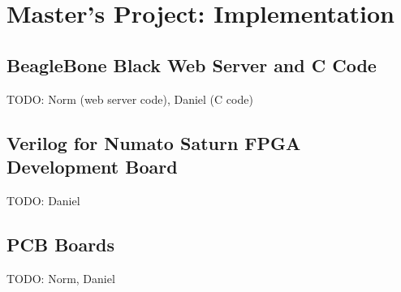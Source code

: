 \section{Master's Project: Implementation}

\subsection{BeagleBone Black Web Server and C Code}
TODO: Norm (web server code), Daniel (C code)
\subsection{Verilog for Numato Saturn FPGA Development Board}
TODO: Daniel
\subsection{PCB Boards}
TODO: Norm, Daniel
\newpage